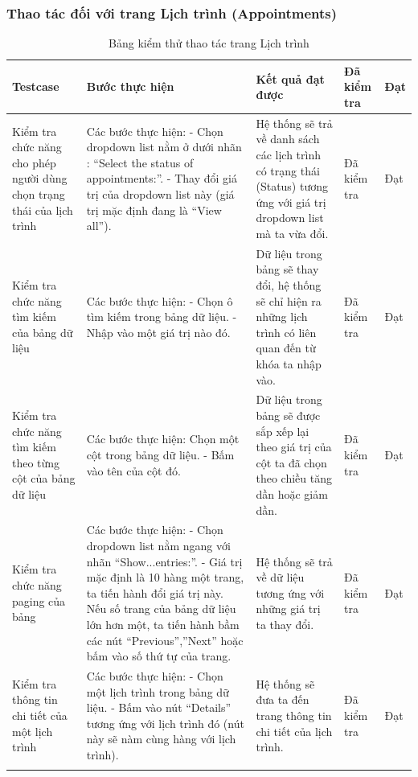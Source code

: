 \documentclass{article}
\begin{document}
\subsubsection{Thao tác đối với trang Lịch trình (Appointments)}
\begin{longtable}{ | p{} |p{} | p{}  | p{}  | p{}  | } 
\hline
\textbf{Testcase}& \textbf{Bước thực hiện}& \textbf{Kết quả đạt được} & \textbf{Đã kiểm tra}& \textbf{Đạt} \\ 
\hline
\hline
Kiểm tra chức năng cho phép người dùng chọn trạng thái của lịch trình &
Các bước thực hiện: \newline
- Chọn dropdown list nằm ở dưới nhãn : “Select the status of appointments:”. \newline
- Thay đổi giá trị của dropdown list này (giá trị mặc định đang là “View all”).
&
Hệ thống sẽ trả về danh sách các lịch trình có trạng thái (Status) tương ứng với giá trị dropdown list mà ta vừa đổi. &
Đã kiểm tra &
Đạt \\

\hline
Kiểm tra chức năng tìm kiếm của bảng dữ liệu &
Các bước thực hiện: \newline
- Chọn ô tìm kiếm trong bảng dữ liệu. \newline
- Nhập vào một giá trị nào đó. 
&
Dữ liệu trong bảng sẽ thay đổi, hệ thống sẽ chỉ hiện ra những lịch trình có liên quan đến từ khóa ta nhập vào. &
Đã kiểm tra &
Đạt \\

\hline
Kiểm tra chức năng tìm kiếm theo từng cột của bảng dữ liệu &
Các bước thực hiện:
Chọn một cột trong bảng dữ liệu. \newline
- Bấm vào tên của cột đó.  \newline
&
Dữ liệu trong bảng sẽ được sắp xếp lại theo giá trị của cột ta đã chọn theo chiều tăng dần hoặc giảm dần. &
Đã kiểm tra &
Đạt \\

\hline
Kiểm tra chức năng paging của bảng &
Các bước thực hiện: \newline
- Chọn dropdown list nằm ngang với nhãn “Show...entries:”.  \newline
- Giá trị mặc định là 10 hàng một trang, ta tiến hành đổi giá trị này. Nếu số trang của bảng dữ liệu lớn hơn một, ta tiến hành bầm các nút “Previous”,”Next” hoặc bấm vào số thứ tự của trang.
&
Hệ thống sẽ trả về dữ liệu tương ứng với những giá trị ta thay đổi. &
Đã kiểm tra &
Đạt \\


\hline
Kiểm tra thông tin chi tiết của một lịch trình &
Các bước thực hiện: \newline
-  Chọn một lịch trình trong bảng dữ liệu. \newline
-  Bấm vào nút “Details” tương ứng với lịch trình đó (nút này sẽ nàm cùng hàng với lịch trình). &
Hệ thống sẽ đưa ta đến trang thông tin chi tiết của lịch trình.&
Đã kiểm tra &
Đạt \\

\hline
\caption{Bảng kiểm thử thao tác trang Lịch trình}
\end{longtable}
\end{document}
